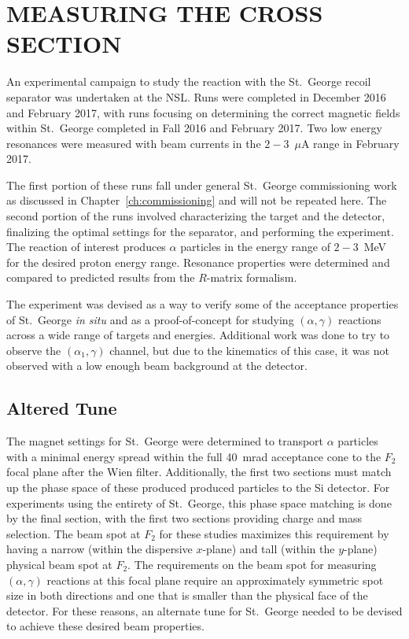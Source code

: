 \chapter{MEASURING THE \alpa{} CROSS SECTION}


An experimental campaign to study the \alpa{} reaction with the St.\ George
recoil separator was undertaken at the NSL. Runs were completed in December
2016 and February 2017, with runs focusing on determining the correct magnetic
fields within St.\ George completed in Fall 2016 and February 2017. Two low
energy resonances were measured with beam currents in the $2-3$~$\mu$A range in
February 2017.

The first portion of these runs fall under general St.\ George
commissioning work as discussed in Chapter~\ref{ch:commissioning} and will not
be repeated here. The second portion of the runs involved characterizing the
target and the detector, finalizing the optimal settings for the separator, and
performing the experiment. The reaction of interest produces $\alpha$ particles
in the energy range of $2-3$~MeV for the desired proton energy range. Resonance
properties were determined and compared to predicted results from the
$R$-matrix formalism.

The experiment was devised as a way to verify some of the acceptance properties
of St.\ George \emph{in situ} and as a proof-of-concept for studying
$(\alpha,\gamma)$ reactions across a wide range of targets and energies.
Additional work was done to try to observe the $(\alpha_1,\gamma)$ channel, but
due to the kinematics of this case, it was not observed with a low enough beam
background at the detector.


\section{Altered Tune}

The magnet settings for St.\ George were determined to transport $\alpha$
particles with a minimal energy spread within the full 40~mrad acceptance cone
to the $F_2$ focal plane after the Wien filter. Additionally, the first two
sections must match up the phase space of these produced produced particles to
the Si detector. For experiments using the entirety of St.\ George, this phase
space matching is done by the final section, with the first two sections
providing charge and mass selection. The beam spot at $F_2$ for these studies
maximizes this requirement by having a narrow (within the dispersive $x$-plane)
and tall (within the $y$-plane) physical beam spot at $F_2$. The requirements
on the beam spot for measuring $(\alpha,\gamma)$ reactions at this focal plane
require an approximately symmetric spot size in both directions and one that
is smaller than the physical face of the detector. For these reasons, an
alternate tune for St.\ George needed to be devised to achieve these desired
beam properties.

